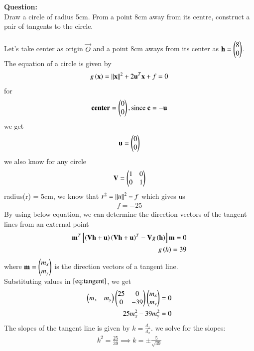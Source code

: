 \documentclass[journal]{IEEEtran}
\begin{document}
\textbf{Question:}\\
Draw a circle of radius 5cm. From a point 8cm away from its centre, construct a pair of tangents to the circle.\\
\solution\\
Let's take center as origin $\vec{O}$ and a point 8cm aways from its center as $\mathbf{h}=\begin{pmatrix}8\\0\end{pmatrix}$.\\
The equation of a circle is given by 
\begin{align}
    g\left(\mathbf{x}\right)=\left\lVert\mathbf{x}\right\rVert^2+2\mathbf{u}^T\mathbf{x}+f=0
\end{align}
for
\begin{align}
\textbf{center}=\begin{pmatrix}0\\0\end{pmatrix}, \text{since } \mathbf{c}=\mathbf{-u} 
\end{align}
we get
\begin{align}
\mathbf{u}=\begin{pmatrix}0\\0\end{pmatrix}
\end{align}
we also know for any circle
\begin{align}
    \mathbf{V}=\begin{pmatrix}1&0\\0&1\end{pmatrix}
\end{align}
radius(r) = 5cm, we know that  $r^2=\left\lVert u\right\rVert^2-f$ which gives us 
\begin{align}
    f=-25
\end{align}
By using below equation, we can determine the direction vectors of the tangent lines from an external point
\begin{align} \mathbf{m}^T{}\left[\left(\mathbf{V}\mathbf{h}+\mathbf{u}\right)\left(\mathbf{V}\mathbf{h}+\mathbf{u}\right)^T-\mathbf{V}g\left(\mathbf{h}\right)\right]\mathbf{m}=0\\
g\left(h\right)=39
\label{eq:tangent}
\end{align}
where $\mathbf{m}=\begin{pmatrix}m_x\\m_y\end{pmatrix}$ is the direction vectors of a tangent line.\\
Substituting values in $\eqref{eq:tangent}$, we get
\begin{align}
\begin{pmatrix}m_x&m_y\end{pmatrix}\begin{pmatrix}25&0\\0&-39\end{pmatrix}\begin{pmatrix}m_x\\m_y\end{pmatrix}=0\\
25m_x^2-39m_y^2=0\\
\end{align}
The slopes of the tangent line is given by $k=\frac{d_x}{d_x}$. we solve for the slopes:
\begin{align}
    k^2=\frac{25}{39}\implies k=\pm\frac{5}{\sqrt{39}}
\end{align}
\end{document}
